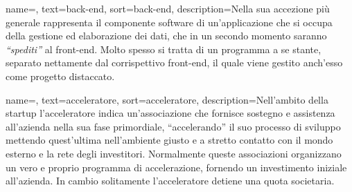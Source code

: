 
\renewcommand{\acronymname}{Acronimi e abbreviazioni}






   
\renewcommand{\glossaryname}{Glossario}

{
    name=,
    text=back-end,
    sort=back-end,
    description={Nella sua accezione più generale rappresenta il componente software di un'applicazione che si occupa della gestione ed elaborazione dei dati, che in un secondo momento saranno \textit{``spediti''} al front-end. Molto spesso si tratta di un programma a se stante, separato nettamente dal corrispettivo front-end, il quale viene gestito anch'esso come progetto distaccato.}
}

{
    name=,
    text=acceleratore,
    sort=acceleratore,
    description={Nell'ambito della startup l'acceleratore indica un'associazione che fornisce sostegno e assistenza all'azienda nella sua fase primordiale, ``accelerando'' il suo processo di sviluppo mettendo quest'ultima nell'ambiente giusto e a stretto contatto con il mondo esterno e la rete degli investitori. Normalmente queste associazioni organizzano un vero e proprio programma di accelerazione, fornendo un investimento iniziale all'azienda. In cambio solitamente l'acceleratore detiene una quota societaria.}
}

